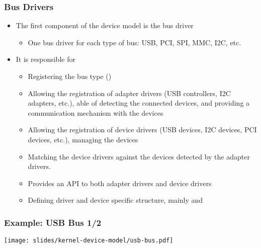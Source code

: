 \begin{frame}
  \frametitle{Bus Drivers}
  \begin{itemize}
  \item The first component of the device model is the bus driver
    \begin{itemize}
    \item One bus driver for each type of bus: USB, PCI, SPI, MMC,
      I2C, etc.
    \end{itemize}
  \item It is responsible for
    \begin{itemize}
    \item Registering the bus type ()
    \item Allowing the registration of adapter drivers (USB
      controllers, I2C adapters, etc.), able of detecting the
      connected devices, and providing a communication mechanism with
      the devices
    \item Allowing the registration of device drivers (USB devices,
      I2C devices, PCI devices, etc.), managing the devices
    \item Matching the device drivers against the devices detected by
      the adapter drivers.
    \item Provides an API to both adapter drivers and device drivers
    \item Defining driver and device specific structure, mainly
       and 
    \end{itemize}
  \end{itemize}
\end{frame}

\begin{frame}
\frametitle{Example: USB Bus 1/2}
  \begin{center}
    \texttt{[image: slides/kernel-device-model/usb-bus.pdf]}
  \end{center}
\end{frame}

